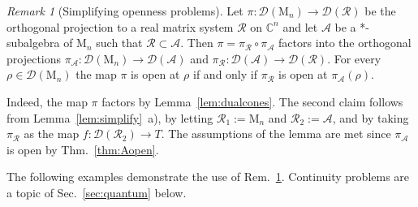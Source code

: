 \documentclass[a4paper,11pt,reqno]{amsart}
\newcommand{\C}{\mathbb{C}}
\newcommand{\M}{\mathrm{M}}
\newcommand{\cA}{\mathcal{A}}
\newcommand{\cD}{\mathcal{D}}
\newcommand{\cR}{\mathcal{R}}
\theoremstyle{definition}
\theoremstyle{remark}
\newtheorem{rem}[thm]{Remark}
\numberwithin{equation}{section}
\begin{document}
%
\begin{rem}[Simplifying openness problems]\label{rem:simplifyA}
Let $\pi:\cD(\M_n)\to\cD(\cR)$ be the orthogonal projection to a real 
matrix system $\cR$ on $\C^n$ and let $\cA$ be a *-subalgebra of $\M_n$ 
such that $\cR\subset\cA$. Then $\pi=\pi_\cR\circ\pi_\cA$ factors into 
the orthogonal projections $\pi_\cA:\cD(\M_n)\to\cD(\cA)$ and 
$\pi_\cR:\cD(\cA)\to\cD(\cR)$. For every $\rho\in\cD(\M_n)$ the map 
$\pi$ is open at $\rho$ if and only if $\pi_\cR$ is open at 
$\pi_\cA(\rho)$.
\par
%
Indeed, the map $\pi$ factors by Lemma~\ref{lem:dualcones}. The second 
claim follows from Lemma~\ref{lem:simplify}~a), by letting $\cR_1:=\M_n$ 
and $\cR_2:=\cA$, and by taking $\pi_\cR$ as the map $f:\cD(\cR_2)\to T$. 
The assumptions of the lemma are met since $\pi_\cA$ is open by 
Thm.~\ref{thm:Aopen}.
\end{rem}
%
The following examples demonstrate the use of Rem.~\ref{rem:simplifyA}.
Continuity problems are a topic of Sec.~\ref{sec:quantum} below. 
\par
%
\end{document}
